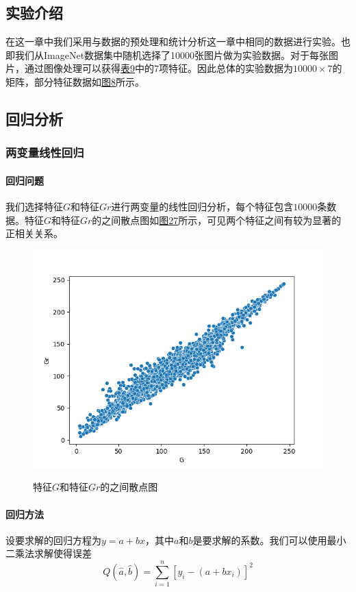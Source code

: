 \documentclass[UTF8]{ctexart}
\begin{document}
	\subsection{实验介绍}
	在这一章中我们采用与数据的预处理和统计分析这一章中相同的数据进行实验。也即我们从ImageNet数据集中随机选择了10000张图片做为实验数据。对于每张图片，通过图像处理可以获得\hyperref[Chart.9]{表9}中的7项特征。因此总体的实验数据为$10000 \times 7$的矩阵，部分特征数据如\hyperref[Fig.8]{图8}所示。
	
	\subsection{回归分析}
	
	\subsubsection{两变量线性回归}
	
	\paragraph{回归问题} 我们选择特征$G$和特征$Gr$进行两变量的线性回归分析，每个特征包含$10000$条数据。特征$G$和特征$Gr$的之间散点图如\hyperref[Fig.27]{图27}所示，可见两个特征之间有较为显著的正相关关系。
	
	\begin{figure}[htbp]
		\centering
		\caption{特征$G$和特征$Gr$的之间散点图}
		\includegraphics[width=1.0\textwidth]{scatter_g_gr.png}
		\label{Fig.27}
	\end{figure}

	\paragraph{回归方法} 设要求解的回归方程为$y = a + bx$，其中$a$和$b$是要求解的系数。我们可以使用最小二乘法求解使得误差
	\begin{equation*}
	Q(\hat{a}, \hat{b}) = \sum\limits_{i=1}^{n}[y_i - (a + bx_i)]^2
	\end{equation*}
	
\end{document}
